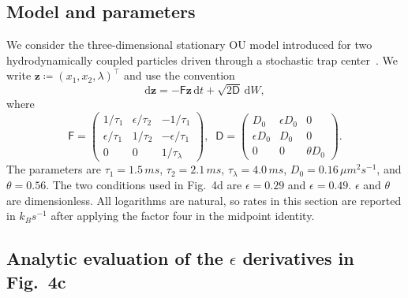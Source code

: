 \documentclass[
 longbibliography,
 twocolumn,
 superscriptaddress,
 amsmath,
 amssymb,
 amsthm,
 amsfonts,
 prl,
 floatfix,
]{revtex4-2}
\newcommand{\matbf}[1]{\boldsymbol{\mathsf{#1}}}
\begin{document}
\begin{widetext}
\subsection{Model and parameters}
\vspace*{-0.6\baselineskip}

We consider the three-dimensional stationary OU model introduced for two hydrodynamically coupled particles driven through a stochastic trap center~\cite{das2025irreversibility}. We write $\bm z\coloneq (x_1,x_2,\lambda)^\intercal$ and use the convention
\begin{equation}
    \mathrm d\bm z=-\matbf F\bm z\,\mathrm dt+\sqrt{2\matbf D}\,\mathrm dW,
\end{equation}
where
\begin{equation*}
    \matbf F\!=\!\!
    \begin{pmatrix}
    1/\tau_1 & \epsilon/{\tau_2} & -1/\tau_1 \\
    \epsilon/\tau_1 & 1/{\tau_2} & -\epsilon/\tau_1 \\
    0 & 0 & 1/\tau_\lambda
    \end{pmatrix}\!\!,
    \;\; 
    \matbf D\!=\!\!
    \begin{pmatrix}
    D_0 & \epsilon D_0 & 0 \\
    \epsilon D_0 & D_0 & 0 \\
    0 & 0 & \theta D_0
    \end{pmatrix}\!.   
    \label{eq:Das_model_details}
\end{equation*}
The parameters are $\tau_1=1.5\,ms$, $\tau_2=2.1\,ms$, $\tau_\lambda=4.0\,ms$, $D_0=0.16\,\mu m^2s^{-1}$, and $\theta=0.56$. The two conditions used in Fig.~4d are $\epsilon=0.29$ and $\epsilon=0.49$. $\epsilon$ and $\theta$ are dimensionless. All logarithms are natural, so rates in this section are reported in $k_B s^{-1}$ after applying the factor four in the midpoint identity.

\subsection{Analytic evaluation of the $\epsilon$ derivatives in Fig.~4c}
\vspace*{-0.6\baselineskip}


\end{widetext}
\end{document}
